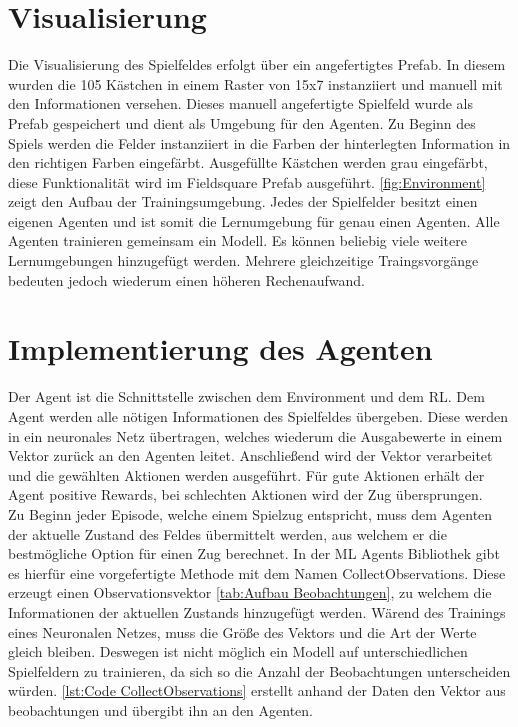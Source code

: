 \section{Visualisierung}
Die Visualisierung des Spielfeldes erfolgt über ein angefertigtes Prefab. In diesem wurden die 105 Kästchen in einem Raster von 15x7 instanziiert und manuell mit den Informationen versehen. Dieses manuell angefertigte Spielfeld wurde als Prefab gespeichert und dient als Umgebung für den Agenten.
Zu Beginn des Spiels werden die Felder instanziiert in die Farben der hinterlegten Information in den richtigen Farben eingefärbt. Ausgefüllte Kästchen werden grau eingefärbt, diese Funktionalität wird im Fieldsquare Prefab ausgeführt. \ref{fig:Environment} zeigt den Aufbau der Trainingsumgebung. Jedes der Spielfelder besitzt einen eigenen Agenten und ist somit die Lernumgebung für genau einen Agenten. Alle Agenten trainieren gemeinsam ein Modell. Es können beliebig viele weitere Lernumgebungen hinzugefügt werden. Mehrere gleichzeitige Traingsvorgänge bedeuten jedoch wiederum einen höheren Rechenaufwand.


\section{Implementierung des Agenten}
Der Agent ist die Schnittstelle zwischen dem Environment und dem RL.
Dem Agent werden alle nötigen Informationen des Spielfeldes übergeben. Diese werden in ein neuronales Netz übertragen, welches wiederum die Ausgabewerte in einem Vektor zurück an den Agenten leitet.
Anschließend wird der Vektor verarbeitet und die gewählten Aktionen werden ausgeführt.
Für gute Aktionen erhält der Agent positive Rewards, bei schlechten Aktionen wird der Zug übersprungen. \\
Zu Beginn jeder Episode, welche einem Spielzug entspricht, muss dem Agenten der aktuelle Zustand des Feldes übermittelt werden, aus welchem er die bestmögliche Option für einen Zug berechnet. In der ML Agents Bibliothek gibt es hierfür eine vorgefertigte Methode mit dem Namen CollectObservations. Diese erzeugt einen Observationsvektor \ref{tab:Aufbau Beobachtungen}, zu welchem die Informationen der aktuellen Zustands hinzugefügt werden.
Wärend des Trainings eines Neuronalen Netzes, muss die Größe des Vektors und die Art der Werte gleich bleiben. Deswegen ist nicht möglich ein Modell auf unterschiedlichen Spielfeldern zu trainieren, da sich so die Anzahl der Beobachtungen unterscheiden würden.
\ref{lst:Code CollectObservations} erstellt anhand der Daten den Vektor aus beobachtungen und übergibt ihn an den Agenten.


